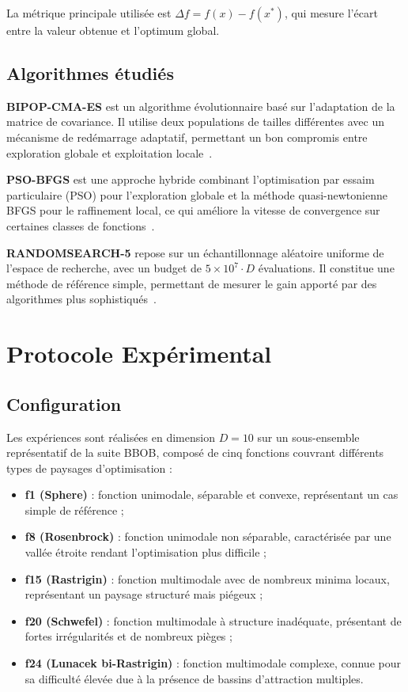 \documentclass[conference]{IEEEtran}
\begin{document}
La m\'etrique principale utilis\'ee est $\Delta f = f(x) - f(x^*)$, qui mesure l'\'ecart entre la valeur obtenue et l'optimum global.

\subsection{Algorithmes \'etudi\'es}

\textbf{BIPOP-CMA-ES} est un algorithme \'evolutionnaire bas\'e sur l'adaptation de la matrice de covariance. Il utilise deux populations de tailles diff\'erentes avec un m\'ecanisme de red\'emarrage adaptatif, permettant un bon compromis entre exploration globale et exploitation locale~\cite{hansen2009bipop}.

\textbf{PSO-BFGS} est une approche hybride combinant l'optimisation par essaim particulaire (PSO) pour l'exploration globale et la m\'ethode quasi-newtonienne BFGS pour le raffinement local, ce qui am\'eliore la vitesse de convergence sur certaines classes de fonctions~\cite{voglis2012mempsode}.

\textbf{RANDOMSEARCH-5} repose sur un \'echantillonnage al\'eatoire uniforme de l'espace de recherche, avec un budget de $5 \times 10^7 \cdot D$ \'evaluations. Il constitue une m\'ethode de r\'ef\'erence simple, permettant de mesurer le gain apport\'e par des algorithmes plus sophistiqu\'es~\cite{brockhoff2017randomsearch}.

\section{Protocole Exp\'erimental}

\subsection{Configuration}

Les exp\'eriences sont r\'ealis\'ees en dimension $D = 10$ sur un sous-ensemble repr\'esentatif de la suite BBOB, compos\'e de cinq fonctions couvrant diff\'erents types de paysages d'optimisation :
\begin{itemize}
    \item \textbf{f1 (Sphere)} : fonction unimodale, s\'eparable et convexe, repr\'esentant un cas simple de r\'ef\'erence ;
    \item \textbf{f8 (Rosenbrock)} : fonction unimodale non s\'eparable, caract\'eris\'ee par une vall\'ee \'etroite rendant l'optimisation plus difficile ;
    \item \textbf{f15 (Rastrigin)} : fonction multimodale avec de nombreux minima locaux, repr\'esentant un paysage structur\'e mais pi\'egeux ;
    \item \textbf{f20 (Schwefel)} : fonction multimodale \`a structure inad\'equate, pr\'esentant de fortes irr\'egularit\'es et de nombreux pi\`eges ;
    \item \textbf{f24 (Lunacek bi-Rastrigin)} : fonction multimodale complexe, connue pour sa difficult\'e \'elev\'ee due \`a la pr\'esence de bassins d'attraction multiples.
\end{itemize}
\end{document}
